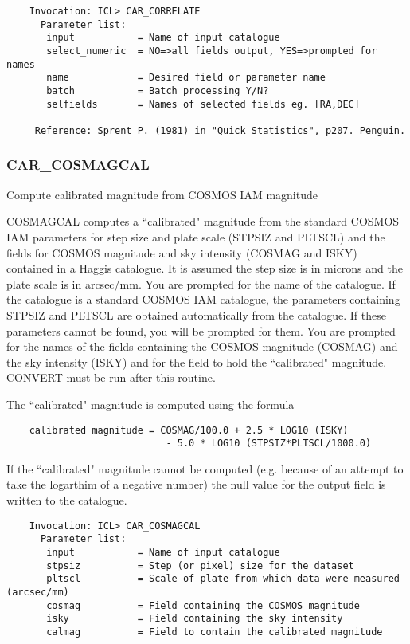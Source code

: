 \begin{verbatim}
    Invocation: ICL> CAR_CORRELATE
      Parameter list:
       input           = Name of input catalogue
       select_numeric  = NO=>all fields output, YES=>prompted for names
       name            = Desired field or parameter name
       batch           = Batch processing Y/N?
       selfields       = Names of selected fields eg. [RA,DEC]

     Reference: Sprent P. (1981) in "Quick Statistics", p207. Penguin.
\end{verbatim}

\subsubsection{CAR\_COSMAGCAL}

Compute calibrated magnitude from COSMOS IAM magnitude

COSMAGCAL computes a ``calibrated" magnitude from the standard
COSMOS IAM parameters for step size and plate scale (STPSIZ and
PLTSCL) and the fields for COSMOS magnitude and sky intensity
(COSMAG and ISKY) contained in a Haggis catalogue.
It is assumed the step size is in microns and the plate scale is
in arcsec/mm.
You are prompted for the name of the catalogue.
If the catalogue is a standard COSMOS IAM catalogue, the parameters
containing STPSIZ and PLTSCL are obtained automatically from
the catalogue.
If these parameters cannot be found, you will be prompted for them.
You are prompted for the names of the fields containing
the COSMOS magnitude (COSMAG) and the sky intensity (ISKY) and
for the field to hold the ``calibrated" magnitude.
CONVERT must be run after this routine.

The ``calibrated" magnitude is computed using the formula
\begin{verbatim}
    calibrated magnitude = COSMAG/100.0 + 2.5 * LOG10 (ISKY)
                            - 5.0 * LOG10 (STPSIZ*PLTSCL/1000.0)
\end{verbatim}
If the ``calibrated" magnitude cannot be computed (e.g. because
of an attempt to take the logarthim of a negative number) the
null value for the output field is written to the catalogue.
\begin{verbatim}
    Invocation: ICL> CAR_COSMAGCAL
      Parameter list:
       input           = Name of input catalogue
       stpsiz          = Step (or pixel) size for the dataset
       pltscl          = Scale of plate from which data were measured (arcsec/mm)
       cosmag          = Field containing the COSMOS magnitude
       isky            = Field containing the sky intensity
       calmag          = Field to contain the calibrated magnitude
\end{verbatim}

